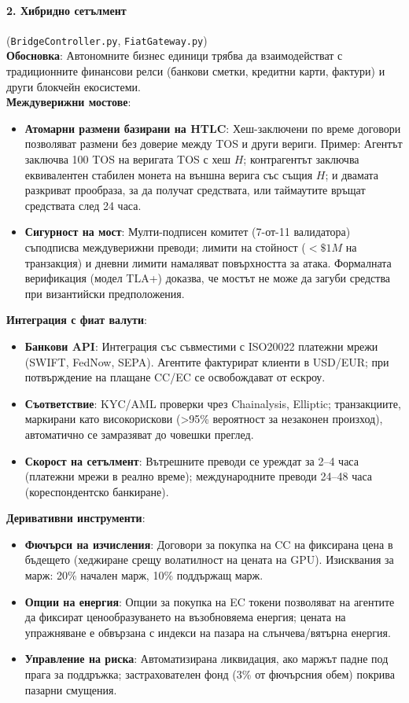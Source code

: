 \documentclass[11pt]{article}
\begin{document}
\paragraph{2. Хибридно сетълмент} (\texttt{BridgeController.py}, \texttt{FiatGateway.py})\\
\textbf{Обосновка}: Автономните бизнес единици трябва да взаимодействат с традиционните финансови релси (банкови сметки, кредитни карти, фактури) и други блокчейн екосистеми.\\
\textbf{Междуверижни мостове}:
\begin{itemize}[noitemsep]
  \item \textbf{Атомарни размени базирани на HTLC}: Хеш-заключени по време договори позволяват размени без доверие между TOS и други вериги. Пример: Агентът заключва 100 TOS на веригата TOS с хеш $H$; контрагентът заключва еквивалентен стабилен монета на външна верига със същия $H$; и двамата разкриват прообраза, за да получат средствата, или таймаутите връщат средствата след 24 часа.
  \item \textbf{Сигурност на мост}: Мулти-подписен комитет (7-от-11 валидатора) съподписва междуверижни преводи; лимити на стойност ($<\$1M$ на транзакция) и дневни лимити намаляват повърхността за атака. Формалната верификация (модел TLA+) доказва, че мостът не може да загуби средства при византийски предположения.
\end{itemize}
\textbf{Интеграция с фиат валути}:
\begin{itemize}[noitemsep]
  \item \textbf{Банкови API}: Интеграция със съвместими с ISO20022 платежни мрежи (SWIFT, FedNow, SEPA). Агентите фактурират клиенти в USD/EUR; при потвърждение на плащане CC/EC се освобождават от ескроу.
  \item \textbf{Съответствие}: KYC/AML проверки чрез Chainalysis, Elliptic; транзакциите, маркирани като високорискови (>95\% вероятност за незаконен произход), автоматично се замразяват до човешки преглед.
  \item \textbf{Скорост на сетълмент}: Вътрешните преводи се уреждат за 2--4 часа (платежни мрежи в реално време); международните преводи 24--48 часа (кореспондентско банкиране).
\end{itemize}
\textbf{Деривативни инструменти}:
\begin{itemize}[noitemsep]
  \item \textbf{Фючърси на изчисления}: Договори за покупка на CC на фиксирана цена в бъдещето (хеджиране срещу волатилност на цената на GPU). Изисквания за марж: 20\% начален марж, 10\% поддържащ марж.
  \item \textbf{Опции на енергия}: Опции за покупка на EC токени позволяват на агентите да фиксират ценообразуването на възобновяема енергия; цената на упражняване е обвързана с индекси на пазара на слънчева/вятърна енергия.
  \item \textbf{Управление на риска}: Автоматизирана ликвидация, ако маржът падне под прага за поддръжка; застрахователен фонд (3\% от фючърсния обем) покрива пазарни смущения.
\end{itemize}
\end{document}
